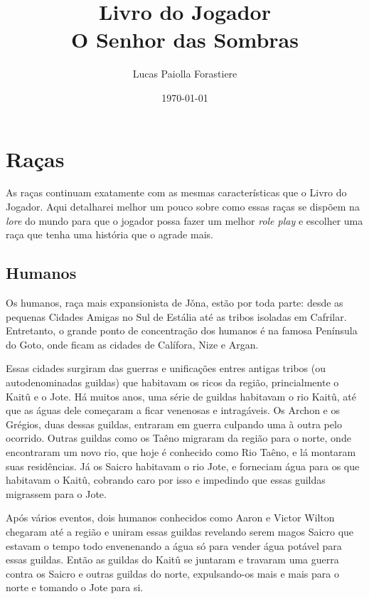 \documentclass{RPG_Adventure}[2021/10/20]
\title{Livro do Jogador\\ \Huge{O Senhor das Sombras}}
\date{\today}
\author{Lucas Paiolla Forastiere}
\begin{document}
\maketitle
\tableofcontents
\newpage


\chapter{Raças}%
\label{cha:racas}

As raças continuam exatamente com as mesmas características que o Livro do
Jogador. Aqui detalharei melhor um pouco sobre como essas raças se dispõem na
\textit{lore} do mundo para que o jogador possa fazer um melhor \textit{role
play} e escolher uma raça que tenha uma história que o agrade mais.

\section*{Humanos}%

Os humanos, raça mais expansionista de Jǒna, estão por toda parte: desde as
pequenas Cidades Amigas no Sul de Estália até as tribos isoladas em Cafrilar.
Entretanto, o grande ponto de concentração dos humanos é na famosa Península do
Goto, onde ficam as cidades de Calífora, Nize e Argan.

Essas cidades surgiram das guerras e unificações entres antigas tribos (ou
autodenominadas guildas) que habitavam os ricos da região, princialmente o
Kaitû e o Jote. Há muitos anos, uma série de guildas habitavam o rio Kaitû, até
que as águas dele começaram a ficar venenosas e intragáveis. Os Archon e os
Grégios, duas dessas guildas, entraram em guerra culpando uma à outra pelo
ocorrido. Outras guildas como os Taêno migraram da região para o norte, onde
encontraram um novo rio, que hoje é conhecido como Rio Taêno, e lá montaram suas
residências. Já os Saicro habitavam o rio Jote, e forneciam água para os que
habitavam o Kaitû, cobrando caro por isso e impedindo que essas guildas
migrassem para o Jote.

Após vários eventos, dois humanos conhecidos como Aaron e Victor Wilton chegaram
até a região e uniram essas guildas revelando serem magos Saicro que estavam o
tempo todo envenenando a água só para vender água potável para essas guildas.
Então as guildas do Kaitû se juntaram e travaram uma guerra contra os Saicro e
outras guildas do norte, expulsando-os mais e mais para o norte e tomando o Jote
para si.
\end{document}
